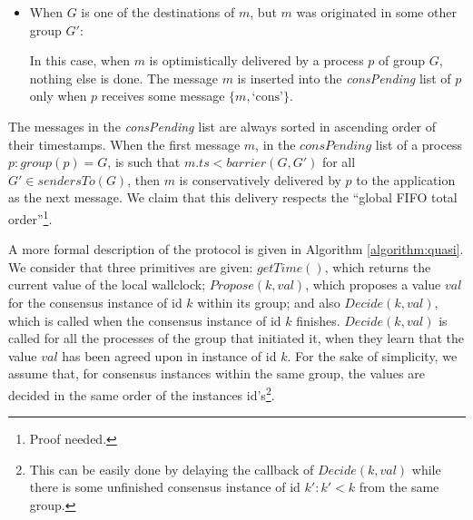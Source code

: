\documentclass[times, 10pt]{article}
\begin{document}
\begin{itemize}
  \item When $G$ is one of the destinations of $m$, but $m$ was originated in some other group $G'$:
  
  In this case, when $m$ is optimistically delivered by a process $p$ of group $G$, nothing else is done. The message $m$ is inserted into the \mbox{\textit{consPending}} list of $p$ only when $p$ receives some message $\{m, \text{`cons'}\}$.
\end{itemize}

The messages in the \textit{consPending} list are always sorted in ascending order of their timestamps. When the first message $m$, in the $consPending$ list of a process $p : group(p) = G$, is such that $m.ts < barrier(G, G')$ for all $G' \in sendersTo(G)$, then $m$ is conservatively delivered by $p$ to the application as the next message. We claim that this delivery respects the ``global FIFO total order''\footnote{Proof needed.}.


A more formal description of the protocol is given in Algorithm \ref{algorithm:quasi}. We consider that three primitives are given: $getTime()$, which returns the current value of the local wallclock; $Propose(k, val)$, which proposes a value $val$ for the consensus instance of id $k$ within its group; and also $Decide(k, val)$, which is called when the consensus instance of id $k$ finishes. $Decide(k, val)$ is called for all the processes of the group that initiated it, when they learn that the value $val$ has been agreed upon in instance of id $k$. For the sake of simplicity, we assume that, for consensus instances within the same group, the values are decided in the same order of the instances id's\footnote{This can be easily done by delaying the callback of $Decide(k, val)$ while there is some unfinished consensus instance of id $k': k' < k$ from the same group.}.
\end{document}
